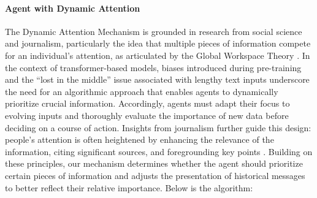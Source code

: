 \paragraph{Agent with Dynamic Attention}
The Dynamic Attention Mechanism is grounded in research from social science and journalism, particularly the idea that multiple pieces of information compete for an individual’s attention, as articulated by the Global Workspace Theory \cite{b51}. In the context of transformer-based models, biases introduced during pre-training \cite{b67} and the ``lost in the middle'' issue associated with lengthy text inputs \cite{b66} underscore the need for an algorithmic approach that enables agents to dynamically prioritize crucial information. Accordingly, agents must adapt their focus to evolving inputs and thoroughly evaluate the importance of new data before deciding on a course of action. Insights from journalism further guide this design: people’s attention is often heightened by enhancing the relevance of the information, citing significant sources, and foregrounding key points \cite{b68}. Building on these principles, our mechanism determines whether the agent should prioritize certain pieces of information and adjusts the presentation of historical messages to better reflect their relative importance. Below is the algorithm:

